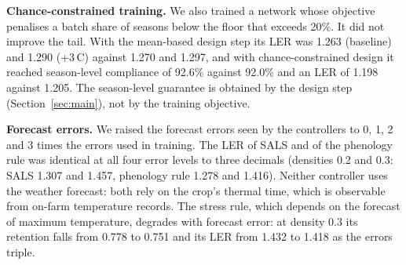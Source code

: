 \textbf{Chance-constrained training.} We also trained a network whose objective penalises a batch share of seasons below the floor that exceeds 20\%. It did not improve the tail. With the mean-based design step its LER was 1.263 (baseline) and 1.290 (+3\,\textdegree C) against 1.270 and 1.297, and with chance-constrained design it reached season-level compliance of 92.6\% against 92.0\% and an LER of 1.198 against 1.205. The season-level guarantee is obtained by the design step (Section~\ref{sec:main}), not by the training objective.

\textbf{Forecast errors.} We raised the forecast errors seen by the controllers to 0, 1, 2 and 3 times the errors used in training. The LER of SALS and of the phenology rule was identical at all four error levels to three decimals (densities 0.2 and 0.3: SALS 1.307 and 1.457, phenology rule 1.278 and 1.416). Neither controller uses the weather forecast: both rely on the crop's thermal time, which is observable from on-farm temperature records. The stress rule, which depends on the forecast of maximum temperature, degrades with forecast error: at density 0.3 its retention falls from 0.778 to 0.751 and its LER from 1.432 to 1.418 as the errors triple.
